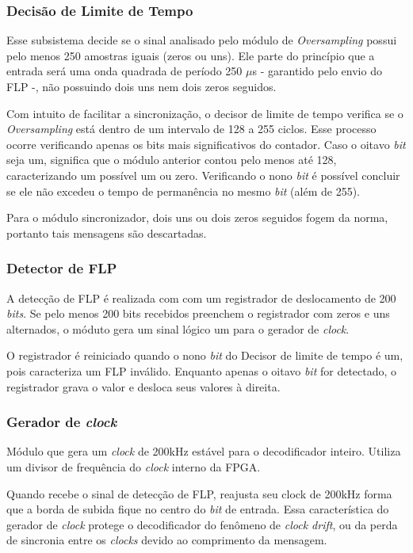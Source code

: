 	\subsubsection{Decisão de Limite de Tempo}
	Esse subsistema decide se o sinal analisado pelo módulo de \textit{Oversampling} possui pelo menos 250 amostras iguais (zeros ou uns). Ele parte do princípio que a entrada será uma onda quadrada de período 250 $\mu$s - garantido pelo envio do FLP -, não possuindo dois uns nem dois zeros seguidos.
	
	Com intuito de facilitar a sincronização, o decisor de limite de tempo verifica se o \textit{Oversampling} está dentro de um intervalo de 128 a 255 ciclos. Esse processo ocorre verificando apenas os bits mais significativos do contador. Caso o oitavo \textit{bit} seja um, significa que o módulo anterior contou pelo menos até 128, caracterizando um possível um ou zero. Verificando o nono \textit{bit} é possível concluir se ele não excedeu o tempo de permanência no mesmo \textit{bit} (além de 255). 
	
	Para o módulo sincronizador, dois uns ou dois zeros seguidos fogem da norma, portanto tais mensagens são descartadas.
	
	\subsubsection{Detector de FLP}
	A detecção de FLP é realizada com com um registrador de deslocamento de 200 \textit{bits}. Se pelo menos 200 bits recebidos preenchem o registrador com zeros e uns alternados, o móduto gera um sinal lógico um para o gerador de \textit{clock}.
	
	O registrador é reiniciado quando o nono \textit{bit} do Decisor de limite de tempo é um, pois caracteriza um FLP inválido. Enquanto apenas o oitavo \textit{bit} for detectado, o registrador grava o valor e desloca seus valores à direita.
	\subsubsection{Gerador de \textit{clock}}
	Módulo que gera um \textit{clock} de 200kHz estável para o decodificador inteiro. Utiliza um divisor de frequência do \textit{clock} interno da FPGA.
	
	Quando recebe o sinal de detecção de FLP, reajusta seu clock de 200kHz forma que a borda de subida fique no centro do \textit{bit} de entrada. Essa característica do gerador de \textit{clock} protege o decodificador do fenômeno de \textit{clock drift}, ou da perda de sincronia entre os \textit{clocks} devido ao comprimento da mensagem.
